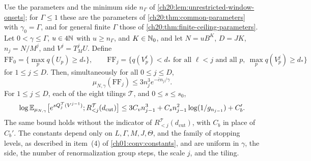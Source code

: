\begin{theorem}\label{ch20:thm:shell-induction}
Use the parameters and the minimum side $n_\Gamma$ of \cref{ch20:lem:unrestricted-window-onsets}; for $\Gamma\le1$ these are the parameters of \cref{ch20:thm:common-parameters} with $\gamma_0=\Gamma$, and for general finite $\Gamma$ those of \cref{ch20:thm:finite-ceiling-parameters}. Let $0<\gamma\le\Gamma$, $u\in4\mathbb N$ with $u\ge n_\Gamma$, and $K\in\mathbb N_0$, and let $N=uB^K$, $D=JK$, $n_j=N/M^j$, and $V^j=T_M^jU$. Define
\[
 \mathrm{FF}_0=\{\max_pq(U_p)\ge d_*\},\qquad
 \mathrm{FF}_j=\{q(V^\ell_p)<d_*\text{ for all }\ell<j\text{ and all }p,\ \max_pq(V^j_p)\ge d_*\}
\]
for $1\le j\le D$. Then, simultaneously for all $0\le j\le D$,
\begin{equation}\label{ch20:eq:first-failure}
 \mu_{N,\gamma}(\mathrm{FF}_j)\le3n_j^3e^{-\bar cn_j/\gamma}.
\end{equation}
For $1\le j\le D$, each of the eight tilings $\mathcal T$, and $0\le s\le s_0$,
\[
 \log\mathbb E_{\mu_{N,\gamma}}\bigl[e^{sQ_j^{\mathcal T}(V^{j-1})};R_{<j}^{\mathcal T}(d_{\mathrm{cut}})\bigr]
 \le3C_vn_{j-1}^3+C_sn_{j-1}^2\log(1/g_{n_{j-1}})+C_b'.
\]
The same bound holds without the indicator of $R_{<j}^{\mathcal T}(d_{\mathrm{cut}})$, with $C_b$ in place of $C_b'$. The constants depend only on $L,\Gamma,M,J,\Theta$, and the family of stopping levels, as described in item~\textup{(4)} of \cref{ch01:conv:constants}, and are uniform in $\gamma$, the side, the number of renormalization group steps, the scale $j$, and the tiling.
\end{theorem}


